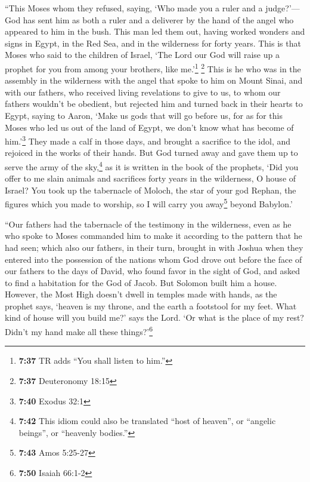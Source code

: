  ``This Moses whom they refused, saying, `Who made you a
ruler and a judge?'---God has sent him as both a ruler and a deliverer
by the hand of the angel who appeared to him in the bush.
 This man led them out, having worked wonders and signs
in Egypt, in the Red Sea, and in the wilderness for forty years.
 This is that Moses who said to the children of Israel,
`The Lord our God will raise up a prophet for you from among your
brothers, like me.'\footnote{\textbf{7:37} TR adds ``You shall listen to
  him.''} \footnote{\textbf{7:37} Deuteronomy 18:15} 
This is he who was in the assembly in the wilderness with the angel that
spoke to him on Mount Sinai, and with our fathers, who received living
revelations to give to us,  to whom our fathers wouldn't
be obedient, but rejected him and turned back in their hearts to Egypt,
 saying to Aaron, `Make us gods that will go before us,
for as for this Moses who led us out of the land of Egypt, we don't know
what has become of him.'\footnote{\textbf{7:40} Exodus 32:1}
 They made a calf in those days, and brought a sacrifice
to the idol, and rejoiced in the works of their hands. 
But God turned away and gave them up to serve the army of the
sky,\footnote{\textbf{7:42} This idiom could also be translated ``host
  of heaven'', or ``angelic beings'', or ``heavenly bodies.''} as it is
written in the book of the prophets, `Did you offer to me slain animals
and sacrifices forty years in the wilderness, O house of Israel?
 You took up the tabernacle of Moloch, the star of your
god Rephan, the figures which you made to worship, so I will carry you
away\footnote{\textbf{7:43} Amos 5:25-27} beyond Babylon.'

 ``Our fathers had the tabernacle of the testimony in the
wilderness, even as he who spoke to Moses commanded him to make it
according to the pattern that he had seen;  which also
our fathers, in their turn, brought in with Joshua when they entered
into the possession of the nations whom God drove out before the face of
our fathers to the days of David,  who found favor in the
sight of God, and asked to find a habitation for the God of Jacob.
 But Solomon built him a house.  However,
the Most High doesn't dwell in temples made with hands, as the prophet
says,  `heaven is my throne, and the earth a footstool
for my feet. What kind of house will you build me?' says the Lord. `Or
what is the place of my rest?  Didn't my hand make all
these things?'\footnote{\textbf{7:50} Isaiah 66:1-2}

